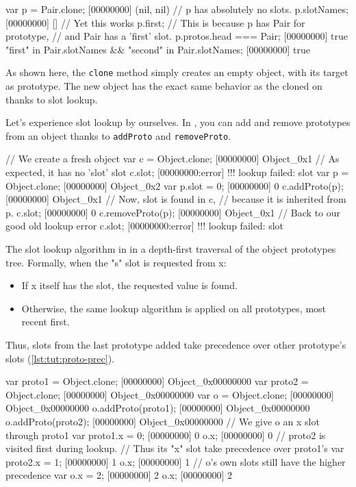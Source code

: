 \begin{urbiscript}[caption=Slot found by lookup, label=lst:tut:simple-lookup]
var p = Pair.clone;
[00000000] (nil, nil)
// p has absolutely no slots.
p.slotNames;
[00000000] []
// Yet this works
p.first;
// This is because p has Pair for prototype,
// and Pair has a 'first' slot.
p.protos.head === Pair;
[00000000] true
"first" in Pair.slotNames && "second" in Pair.slotNames;
[00000000] true
\end{urbiscript}

As shown here, the \lstinline{clone} method simply creates an empty
object, with its target as prototype. The new object has the exact
same behavior as the cloned on thanks to slot lookup.

Let's experience slot lookup by ourselves. In \us, you can add and
remove prototypes from an object thanks to \lstinline{addProto} and
\lstinline{removeProto}.

\begin{urbiscript}[caption=Manipulating prototypes, label=lst:tut:proto-change]
// We create a fresh object
var c = Object.clone;
[00000000] Object_0x1
// As expected, it has no 'slot' slot
c.slot;
[00000000:error] !!! lookup failed: slot
var p = Object.clone;
[00000000] Object_0x2
var p.slot = 0;
[00000000] 0
c.addProto(p);
[00000000] Object_0x1
// Now, slot is found in c,
// because it is inherited from p.
c.slot;
[00000000] 0
c.removeProto(p);
[00000000] Object_0x1
// Back to our good old lookup error
c.slot;
[00000000:error] !!! lookup failed: slot
\end{urbiscript}

The slot lookup algorithm in \us in a depth-first traversal of the
object prototypes tree. Formally, when the "s" slot is requested from
x:

\begin{itemize}
\item If x itself has the slot, the requested value is found.
\item Otherwise, the same lookup algorithm is applied on all
  prototypes, most recent first.
\end{itemize}

Thus, slots from the last prototype added take precedence over other
prototype's slots (\autoref{lst:tut:proto-prec}).

\begin{urbiscript}[caption=Prototype precedence, label=lst:tut:proto-prec]
var proto1 = Object.clone;
[00000000] Object_0x00000000
var proto2 = Object.clone;
[00000000] Object_0x00000000
var o = Object.clone;
[00000000] Object_0x00000000
o.addProto(proto1);
[00000000] Object_0x00000000
o.addProto(proto2);
[00000000] Object_0x00000000
// We give o an x slot through proto1
var proto1.x = 0;
[00000000] 0
o.x;
[00000000] 0
// proto2 is visited first during lookup.
// Thus its "x" slot take precedence over proto1's
var proto2.x = 1;
[00000000] 1
o.x;
[00000000] 1
// o's own slots still have the higher precedence
var o.x = 2;
[00000000] 2
o.x;
[00000000] 2
\end{urbiscript}

